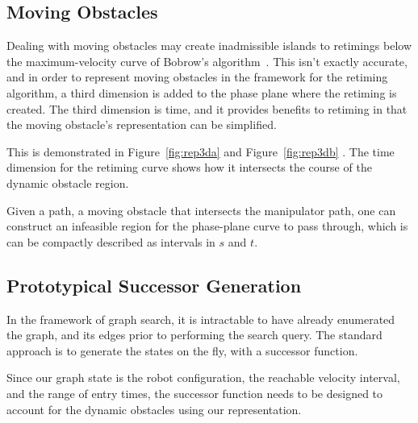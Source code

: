\documentclass[letterpaper,11pt]{article} %
\newcommand{\ffigdouble}[4]{
\begin{figure}[h!]
\centering

\begin{subfigure}[l!]{0.48\linewidth}
\texttt{[image: \#1]}
\caption{}
\label{fig:#4L}
\end{subfigure}
~
\begin{subfigure}[r!]{0.48\linewidth}
\texttt{[image: \#2]}
\caption{}
\label{fig:#4R}
\end{subfigure}

\caption{#3}
\label{fig:#4}
\end{figure}
}
\newif\ifpfig
\newcommand{\reffig}[1]
{
Figure~\ref{fig:#1}
}
\begin{document}
\subsection{Moving Obstacles}\label{subsec:obs}

Dealing with moving obstacles may create inadmissible islands to retimings below the maximum-velocity curve of Bobrow's algorithm~\cite{shin1985minimum}. This isn't exactly accurate, and in order to represent moving obstacles in the framework for the retiming algorithm, a third dimension is added to the phase plane where the retiming is created. The third dimension is time, and it provides benefits to retiming in that the moving obstacle's representation can be simplified.

This is demonstrated in \reffig{rep3da} and \reffig{rep3db}. The time dimension for the retiming curve shows how it intersects the course of the dynamic obstacle region.

\ifpfig
\ffigdouble{pics/representation3d1}{pics/representation3d2}{Two viewpoints of the retiming curve constructed in the $s$-$\dot{s}$ plane and then rendered in the $t$-dimension, which shows how it intersects with the region rendered inadmissible by collision checking}{rep3da}

\ffigdouble{pics/representation3d3}{pics/representation3d4}{Representation of moving obstacle to the path of the end effector from the: (a) $s$-$t$ plane viewpoint where the dark-red region is the region of collision, and (b) $s$-$\dot{s}$ viewpoint where the green region ambiguously represents the collision region of the dynamic obstacle}{rep3db}
\fi

Given a path, a moving obstacle that intersects the manipulator path, one can construct an infeasible region for the phase-plane curve to pass through, which is can be compactly described as intervals in $s$ and $t$.

\subsection{Prototypical Successor Generation}\label{subsec:succ}

In the framework of graph search, it is intractable to have already enumerated the graph, and its edges prior to performing the search query. The standard approach is to generate the states on the fly, with a successor function.

Since our graph state is the robot configuration, the reachable velocity interval, and the range of entry times, the successor function needs to be designed to account for the dynamic obstacles using our representation.
\end{document}
